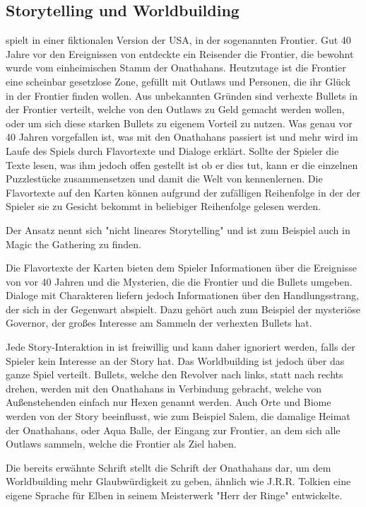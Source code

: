 \subsection{Storytelling und Worldbuilding}\label{subsec:storytellingUndWorldbuilding}

\FF spielt in einer fiktionalen Version der USA, in der sogenannten Frontier. Gut 40 Jahre vor den Ereignissen von \FF
entdeckte ein Reisender die Frontier, die bewohnt wurde vom einheimischen Stamm der Onathahans. Heutzutage ist die Frontier
eine scheinbar gesetzlose Zone, gefüllt mit Outlaws und Personen, die ihr Glück in der Frontier finden wollen.
Aus unbekannten Gründen sind verhexte Bullets in der Frontier verteilt, welche von den Outlaws zu Geld gemacht werden wollen,
oder um sich diese starken Bullets zu eigenem Vorteil zu nutzen. Was genau vor 40 Jahren vorgefallen ist, was mit den Onathahans
passiert ist und mehr wird im Laufe des Spiels durch Flavortexte und Dialoge erklärt. Sollte der Spieler die Texte lesen,
was ihm jedoch offen gestellt ist ob er dies tut, kann er die einzelnen Puzzlestücke zusammensetzen und damit die Welt von \FF kennenlernen.
Die Flavortexte auf den Karten können aufgrund der zufälligen Reihenfolge in der der Spieler sie zu Gesicht bekommt in beliebiger Reihenfolge gelesen werden.


Der Ansatz nennt sich "nicht lineares Storytelling" und ist zum Beispiel auch in Magic the Gathering zu finden.\cite{nonlinearstorytelling}


Die Flavortexte der Karten bieten dem Spieler Informationen über die Ereignisse von vor 40 Jahren und die Mysterien,
die die Frontier und die Bullets umgeben. Dialoge mit Charakteren liefern jedoch Informationen über den Handlungsstrang,
der sich in der Gegenwart abspielt. Dazu gehört auch zum Beispiel der mysteriöse Governor, der großes Interesse am Sammeln der verhexten Bullets hat.


Jede Story-Interaktion in \FF ist freiwillig und kann daher ignoriert werden, falls der Spieler kein Interesse an der Story hat.
Das Worldbuilding ist jedoch über das ganze Spiel verteilt. Bullets, welche den Revolver nach links, statt nach rechts drehen,
werden mit den Onathahans in Verbindung gebracht, welche von Außenstehenden einfach nur Hexen genannt werden.
Auch Orte und Biome werden von der Story beeinflusst, wie zum Beispiel Salem, die damalige Heimat der Onathahans, oder Aqua Balle,
der Eingang zur Frontier, an dem sich alle Outlaws sammeln, welche die Frontier als Ziel haben.


Die bereits erwähnte Schrift stellt die Schrift der Onathahans dar, um dem Worldbuilding mehr Glaubwürdigkeit zu geben,
ähnlich wie J.R.R. Tolkien eine eigene Sprache für Elben in seinem Meisterwerk "Herr der Ringe" entwickelte. \cite{elbenSprache}

\renewcommand{\kapitelautor}{}
